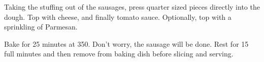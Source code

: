 \begin{recipe}

Taking the stuffing out of the sausages, press quarter sized pieces directly into the dough. Top with cheese, and finally tomato sauce. Optionally, top with a sprinkling of Parmesan.

Bake for 25 minutes at 350. Don't worry, the sausage will be done. Rest for 15 full minutes and then remove from baking dish before slicing and serving.


\end{recipe}
